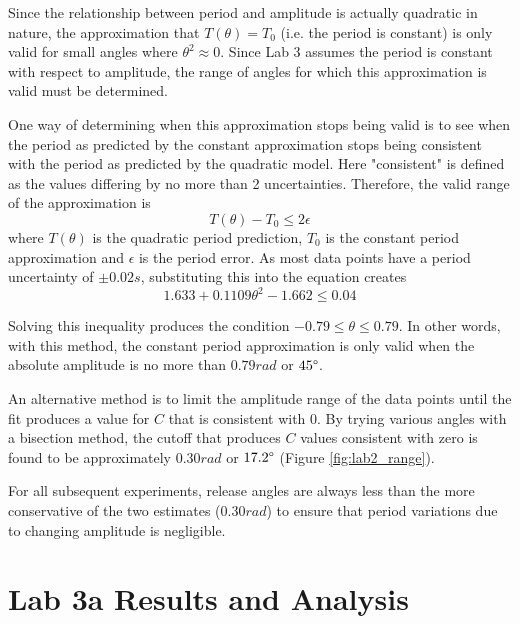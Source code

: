 \documentclass[aps,twocolumn,secnumarabic,nobalancelastpage,amsmath,amssymb,nofootinbib,floatfix,letterpaper]{revtex4}
\begin{document}
Since the relationship between period and amplitude is actually quadratic in nature, the approximation that
\(T(\theta) = T_0\) (i.e. the period is constant) is only valid for small angles where \(\theta^2 \approx 0\). Since
Lab 3 assumes the period is constant with respect to amplitude, the range of angles for which this approximation is
valid must be determined.

One way of determining when this approximation stops being valid is to see when the period as predicted by the constant
approximation stops being consistent with the period as predicted by the quadratic model. Here "consistent" is defined
as the values differing by no more than 2 uncertainties. Therefore, the valid range of the approximation is
\begin{equation}
    T(\theta) - T_0 \leq 2\epsilon
\end{equation}
where \(T(\theta)\) is the quadratic period prediction, \(T_0\) is the constant period approximation and \(\epsilon\) is
the period error. As most data points have a period uncertainty of \(\pm 0.02\si{s}\), substituting this into the
equation creates
\begin{equation}
    1.633 + 0.1109\theta^2 - 1.662 \leq 0.04
\end{equation}

Solving this inequality produces the condition \(-0.79 \leq \theta \leq 0.79\). In other words, with this method,
the constant period approximation is only valid when the absolute amplitude is no more than \(0.79\si{rad}\) or
\(45\degree\).

An alternative method is to limit the amplitude range of the data points until the fit produces a value for \(C\) that
is consistent with 0. By trying various angles with a bisection method, the cutoff that produces \(C\) values consistent
with zero is found to be approximately \(0.30\si{rad}\) or \(17.2\degree\) (Figure \ref{fig:lab2_range}).

For all subsequent experiments, release angles are always less than the more conservative of the two estimates
(\(0.30\si{rad}\)) to ensure that period variations due to changing amplitude is negligible.


\section{Lab 3a Results and Analysis}
\end{document}

